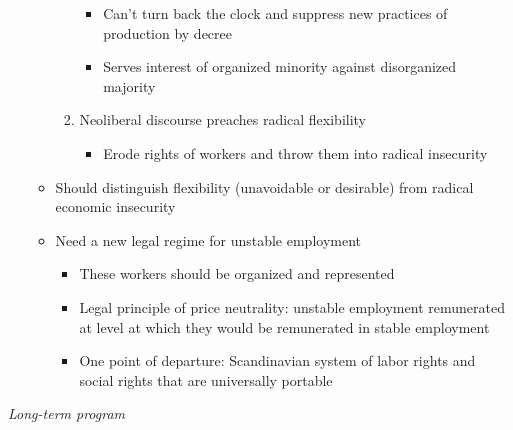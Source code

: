 \begin{itemize}
\begin{enumerate}
\begin{enumerate}
      \begin{itemize}
      \tightlist
      \item
        Can't turn back the clock and suppress new practices of
        production by decree
      \item
        Serves interest of organized minority against disorganized
        majority
      \end{itemize}
    \item
      Neoliberal discourse preaches radical flexibility

      \begin{itemize}
      \tightlist
      \item
        Erode rights of workers and throw them into radical insecurity
      \end{itemize}
    \end{enumerate}
  \end{enumerate}

  \begin{itemize}
  \tightlist
  \item
    Should distinguish flexibility (unavoidable or desirable) from
    radical economic insecurity
  \item
    Need a new legal regime for unstable employment

    \begin{itemize}
    \tightlist
    \item
      These workers should be organized and represented
    \item
      Legal principle of price neutrality: unstable employment
      remunerated at level at which they would be remunerated in stable
      employment
    \item
      One point of departure: Scandinavian system of labor rights and
      social rights that are universally portable
    \end{itemize}
  \end{itemize}
\end{itemize}

\emph{Long-term program}

